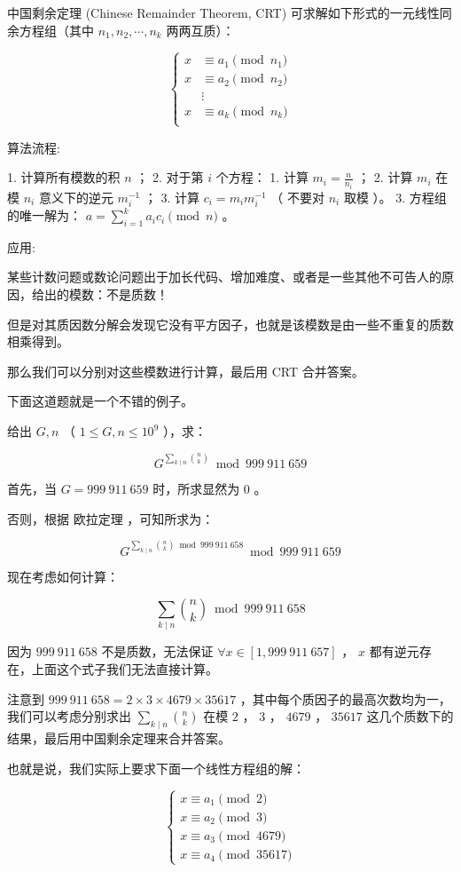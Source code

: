 中国剩余定理 (Chinese Remainder Theorem, CRT) 可求解如下形式的一元线性同余方程组（其中 $n_1, n_2, \cdots, n_k$ 两两互质）：

$$
\begin{cases}
x &\equiv a_1 \pmod {n_1} \\
x &\equiv a_2 \pmod {n_2} \\
  &\vdots \\
x &\equiv a_k \pmod {n_k} \\
\end{cases}
$$

算法流程:

1. 计算所有模数的积 $n$ ；
2.  对于第 $i$ 个方程：
    1. 计算 $m_i=\frac{n}{n_i}$ ；
    2. 计算 $m_i$ 在模 $n_i$ 意义下的逆元  $m_i^{-1}$ ；
    3. 计算 $c_i=m_im_i^{-1}$ （ 不要对 $n_i$ 取模 ）。
3. 方程组的唯一解为： $a=\sum_{i=1}^k a_ic_i \pmod n$ 。

应用:

某些计数问题或数论问题出于加长代码、增加难度、或者是一些其他不可告人的原因，给出的模数：不是质数！

但是对其质因数分解会发现它没有平方因子，也就是该模数是由一些不重复的质数相乘得到。

那么我们可以分别对这些模数进行计算，最后用 CRT 合并答案。

下面这道题就是一个不错的例子。

    给出 $G,n$ （ $1 \leq G,n \leq 10^9$ ），求：
    
    $$
    G^{\sum_{k\mid n}\binom{n}{k}} \bmod 999~911~659
    $$

首先，当 $G=999~911~659$ 时，所求显然为 $0$ 。

否则，根据 欧拉定理 ，可知所求为：

$$
G^{\sum_{k\mid n}\binom{n}{k} \bmod 999~911~658} \bmod 999~911~659
$$

现在考虑如何计算：

$$
\sum_{k\mid n}\binom{n}{k} \bmod 999~911~658
$$

因为 $999~911~658$ 不是质数，无法保证 $\forall x \in [1,999~911~657]$ ， $x$ 都有逆元存在，上面这个式子我们无法直接计算。

注意到 $999~911~658=2 \times 3 \times 4679 \times 35617$ ，其中每个质因子的最高次数均为一，我们可以考虑分别求出 $\sum_{k\mid n}\binom{n}{k}$ 在模 $2$ ， $3$ ， $4679$ ， $35617$ 这几个质数下的结果，最后用中国剩余定理来合并答案。

也就是说，我们实际上要求下面一个线性方程组的解：

$$
\begin{cases}
x \equiv a_1 \pmod 2\\
x \equiv a_2 \pmod 3\\
x \equiv a_3 \pmod {4679}\\
x \equiv a_4 \pmod {35617}
\end{cases}
$$

